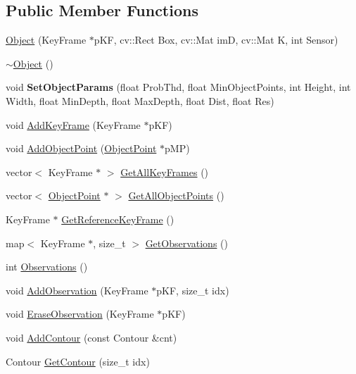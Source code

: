 \subsection*{Public Member Functions}
\begin{DoxyCompactItemize}
\item 
\hyperlink{classObject_a8710a1b07956b7eadc6b05563fbb6016}{Object} (Key\+Frame $\ast$p\+KF, cv\+::\+Rect Box, cv\+::\+Mat imD, cv\+::\+Mat K, int Sensor)
\item 
\hyperlink{classObject_ae8f5483f459e46687bd01e6f9977afd3}{$\sim$\+Object} ()
\item 
\mbox{\label{classObject_a84c579c83ad0e713014dd9b2a4bf1d81}} 
void {\bfseries Set\+Object\+Params} (float Prob\+Thd, float Min\+Object\+Points, int Height, int Width, float Min\+Depth, float Max\+Depth, float Dist, float Res)
\item 
void \hyperlink{classObject_a6661c15e096fc5ec5b6eba0eda114ac8}{Add\+Key\+Frame} (Key\+Frame $\ast$p\+KF)
\item 
void \hyperlink{classObject_a0272ba2a458346ce9e53fa0fba7799bd}{Add\+Object\+Point} (\hyperlink{classObjectPoint}{Object\+Point} $\ast$p\+MP)
\item 
vector$<$ Key\+Frame $\ast$ $>$ \hyperlink{classObject_ad2535d39e437bf0ea9ff663dbfd3b7d0}{Get\+All\+Key\+Frames} ()
\item 
vector$<$ \hyperlink{classObjectPoint}{Object\+Point} $\ast$ $>$ \hyperlink{classObject_a53b5db01428c4bcf2b54c27b0074257f}{Get\+All\+Object\+Points} ()
\item 
Key\+Frame $\ast$ \hyperlink{classObject_a3513873d737b0557c12c47c19ae2c291}{Get\+Reference\+Key\+Frame} ()
\item 
map$<$ Key\+Frame $\ast$, size\+\_\+t $>$ \hyperlink{classObject_ab17d7f60abbec82a3b45fdf322ea472e}{Get\+Observations} ()
\item 
int \hyperlink{classObject_a3b40498cabe036689eff2862e1fd8143}{Observations} ()
\item 
void \hyperlink{classObject_a1e7dbe097a891bee611dd36d64b5de64}{Add\+Observation} (Key\+Frame $\ast$p\+KF, size\+\_\+t idx)
\item 
void \hyperlink{classObject_a2f6308e77b95e3302a2f60c838839a20}{Erase\+Observation} (Key\+Frame $\ast$p\+KF)
\item 
void \hyperlink{classObject_ad585053a0c8b020a262c75fbd8c9d428}{Add\+Contour} (const Contour \&cnt)
\item 
Contour \hyperlink{classObject_a0e1e343172b51146a8e1af92ba2938d1}{Get\+Contour} (size\+\_\+t idx)

\end{DoxyCompactItemize}
